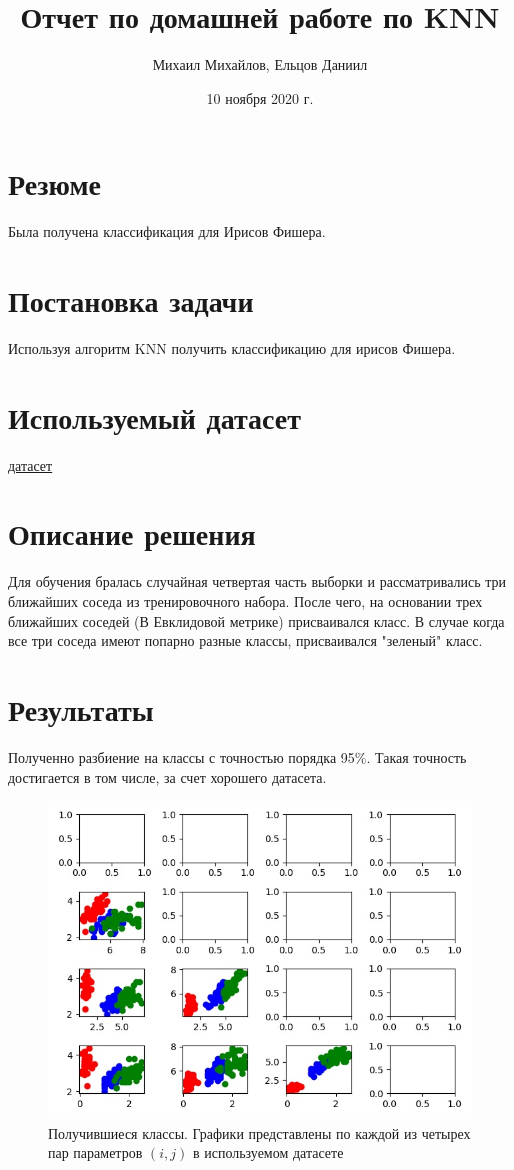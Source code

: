 \documentclass{article}
\title{Отчет по домашней работе по KNN}
\author{Михаил Михайлов, Ельцов Даниил}
\date{10 ноября 2020 г.}
\begin{document}
\maketitle
\tableofcontents

\section*{Резюме}
Была получена классификация для Ирисов Фишера. 
\newpage

\section{Постановка задачи}
Используя алгоритм KNN получить классификацию для ирисов Фишера.

\section{Используемый датасет}
\href{https://www.kaggle.com/uciёml/iris}{датасет}

\section{Описание решения}

Для обучения бралась случайная четвертая часть выборки и рассматривались три ближайших соседа из тренировочного набора. После чего, на основании трех ближайших соседей (В Евклидовой метрике) присваивался класс. В случае когда все три соседа имеют попарно разные классы, присваивался "зеленый" класс.


\section{Результаты}
Полученно разбиение на классы с точностью порядка 95\%. Такая точность достигается в том числе, за счет хорошего датасета. 

\begin{figure}[h!]
    \centering
    \includegraphics[scale=0.3]{results.jpg}
    \caption{Получившиеся классы. Графики представлены по каждой из четырех пар параметров \((i, j)\) в используемом датасете}
    \label{fig1}
\end{figure}
\end{document}
